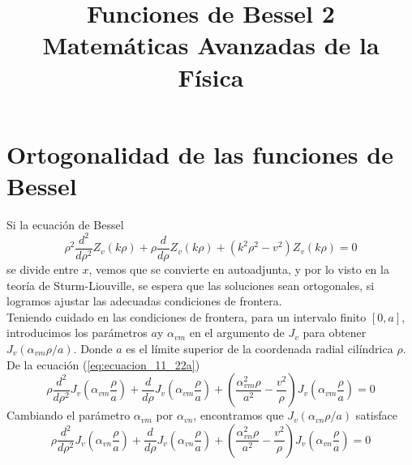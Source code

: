 
\usepackage{mathrsfs}
\usepackage{bigints}
\title{Funciones de Bessel 2 \\ {\large Matemáticas Avanzadas de la Física}}
\date{ }

\renewcommand\labelenumii{\theenumi.{\arabic{enumii}}}
\maketitle
\fontsize{14}{14}\selectfont
\section{Ortogonalidad de las funciones de Bessel}
Si la ecuación de Bessel 
\begin{equation}
\rho^{2} \dfrac{d^{2}}{d \rho^{2}} Z_{v} (k \rho) + \rho \dfrac{d}{d \rho} Z_{v} (k \rho) + (k^{2} \rho^{2} - v^{2}) Z_{v} (k \rho) = 0
\label{eq:ecuacion_11_22a}
\end{equation}
se divide entre $x$, vemos que se convierte en autoadjunta, y por lo visto en la teoría de Sturm-Liouville, se espera que las soluciones sean ortogonales, si logramos ajustar las adecuadas condiciones de frontera.
\\
Teniendo cuidado en las condiciones de frontera, para un intervalo finito $[0,a]$, introducimos los parámetros $a$y $\alpha_{vm}$ en el argumento de $J_{v}$ para obtener $J_{v}(\alpha_{vm} \rho /a)$. Donde $a$ es el límite superior de la coordenada radial cilíndrica $\rho$.
\\
De la ecuación (\ref{eq:ecuacion_11_22a})
\begin{equation}
\rho \dfrac{d^{2}}{d \rho^{2}} J_{v} \left( \alpha_{vm} \dfrac{\rho}{a} \right) + \dfrac{d}{d \rho} J_{v} \left( \alpha_{vm} \dfrac{\rho}{a} \right) + \left( \dfrac{\alpha_{vm}^{2} \rho}{a^{2}} - \dfrac{v^{2}}{\rho} \right) J_{v} \left( \alpha_{vm} \dfrac{\rho}{a} \right) = 0
\label{eq:ecuacion_11_45}
\end{equation}
Cambiando el parámetro $\alpha_{vm}$ por $\alpha_{vn}$, encontramos que $J_{v}(\alpha_{vn} \rho /a)$ satisface
\begin{equation}
\rho \dfrac{d^{2}}{d \rho^{2}} J_{v} \left( \alpha_{vn} \dfrac{\rho}{a} \right) + \dfrac{d}{d \rho} J_{v} \left( \alpha_{vn} \dfrac{\rho}{a} \right) + \left( \dfrac{\alpha_{vn}^{2} \rho}{a^{2}} - \dfrac{v^{2}}{\rho} \right) J_{v} \left( \alpha_{vn} \dfrac{\rho}{a} \right) = 0
\label{eq:ecuacion_11_45a}
\end{equation}
